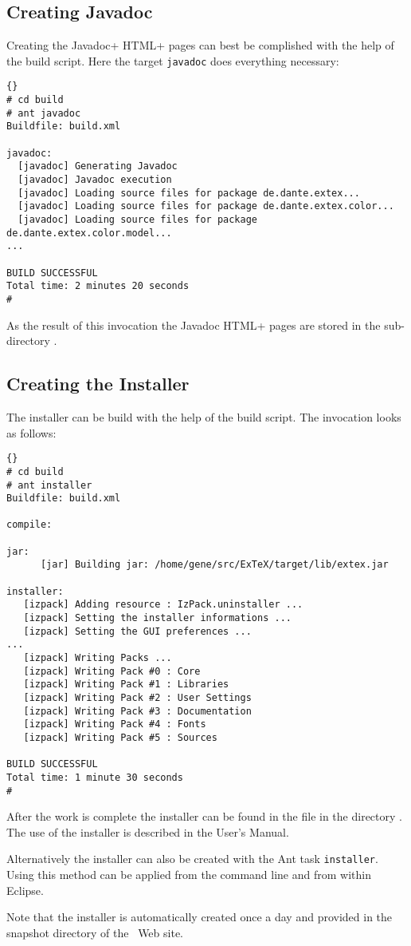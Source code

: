 \subsection{Creating Javadoc}\label{sec:shell-javadoc}

Creating the \+Javadoc+ \+HTML+ pages can best be complished with the
help of the build script. Here the target \texttt{javadoc} does
everything necessary:

\begin{lstlisting}{}
# cd build
# ant javadoc
Buildfile: build.xml

javadoc:
  [javadoc] Generating Javadoc
  [javadoc] Javadoc execution
  [javadoc] Loading source files for package de.dante.extex...
  [javadoc] Loading source files for package de.dante.extex.color...
  [javadoc] Loading source files for package de.dante.extex.color.model...
...

BUILD SUCCESSFUL
Total time: 2 minutes 20 seconds
#
\end{lstlisting}{}

As the result of this invocation the Javadoc \+HTML+ pages are stored in
the sub-directory .


\subsection{Creating the Installer}\label{sec:shell-installer}

The installer can be build with the help of the build script. The
invocation looks as follows:

\begin{lstlisting}{}
# cd build
# ant installer
Buildfile: build.xml

compile:

jar:
      [jar] Building jar: /home/gene/src/ExTeX/target/lib/extex.jar

installer:
   [izpack] Adding resource : IzPack.uninstaller ...
   [izpack] Setting the installer informations ...
   [izpack] Setting the GUI preferences ...
... 
   [izpack] Writing Packs ...
   [izpack] Writing Pack #0 : Core
   [izpack] Writing Pack #1 : Libraries
   [izpack] Writing Pack #2 : User Settings
   [izpack] Writing Pack #3 : Documentation
   [izpack] Writing Pack #4 : Fonts
   [izpack] Writing Pack #5 : Sources

BUILD SUCCESSFUL
Total time: 1 minute 30 seconds
#
\end{lstlisting}{}

After the work is complete the installer can be found in the file
 in the directory . The use of the
installer is described in the User's Manual.

Alternatively the installer can also be created with the Ant task
\texttt{installer}. Using this method can be applied from the command
line and from within Eclipse.

Note that the installer is automatically created once a day and
provided in the snapshot directory of the \ExTeX\ Web site.

